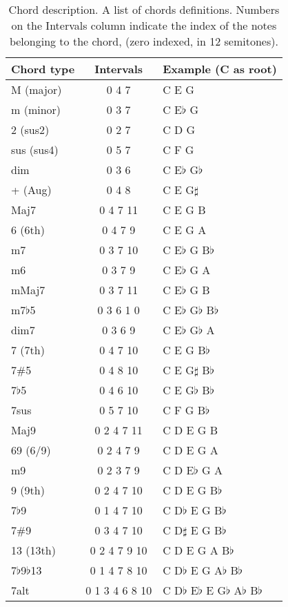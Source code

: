 \begin{table}[ht!]
\centering
  
  \begin{tabular}{  l  c  l }
    \hline
    Chord type & Intervals & Example (C as root) \\ \hline
    M (major) & 0 4 7 & C E G \\
    m (minor) & 0 3 7 & C E$\flat$ G \\
    2 (sus2) & 0 2 7 & C D G \\
	sus (sus4) & 0 5 7 & C F G \\
    dim & 0 3 6 &  C E$\flat$ G$\flat$\\
    + (Aug) & 0 4 8 & C E G$\sharp$ \\
	Maj7 & 0 4 7 11 & C E G B \\
	6 (6th) & 0 4 7 9 & C E G A \\
	m7 & 0 3 7 10 & C E$\flat$ G B$\flat$ \\
	m6 & 0 3 7 9 & C E$\flat$ G A \\
	mMaj7 & 0 3 7 11 & C E$\flat$ G B \\
    m7$\flat$5 & 0 3 6 1 0& C E$\flat$ G$\flat$ B$\flat$ \\
    dim7 & 0 3 6 9 & C E$\flat$ G$\flat$ A \\
	7 (7th) & 0 4 7 10 & C E G B$\flat$ \\
	7\#5 & 0 4 8 10 & C E G$\sharp$ B$\flat$ \\
	7$\flat$5 & 0 4 6 10 & C E G$\flat$ B$\flat$ \\
	7sus & 0 5 7 10 & C F G B$\flat$ \\
	Maj9 & 0 2 4 7 11 & C D E G B \\
	69 (6/9) & 0 2 4 7 9 & C D E G A \\
	m9 & 0 2 3 7 9 & C D E$\flat$ G A \\
	9 (9th) & 0 2 4 7 10 & C D E G B$\flat$ \\
	7$\flat$9 & 0 1 4 7 10 & C D$\flat$ E G B$\flat$ \\
	7\#9 & 0 3 4 7 10 & C D$\sharp$ E G B$\flat$ \\
	13 (13th) & 0 2 4 7 9 10 & C D E G A B$\flat$ \\
	7$\flat$9$\flat$13 & 0 1 4 7 8 10 & C D$\flat$ E G A$\flat$ B$\flat$ \\
	7alt & 0 1 3 4 6 8 10 & C D$\flat$ E$\flat$ E G$\flat$ A$\flat$ B$\flat$ \\
    \hline
  \end{tabular}
  
  \caption[Chord description.] {Chord description. A list of chords definitions.  Numbers on the Intervals column indicate the index of the notes belonging to the chord, (zero indexed, in 12 semitones).}
  \label{tab:chord_extensions}

\end{table}
